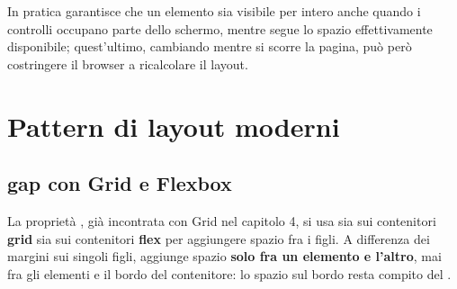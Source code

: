 In pratica  garantisce che un elemento sia visibile per intero
anche quando i controlli occupano parte dello schermo, mentre 
segue lo spazio effettivamente disponibile; quest'ultimo, cambiando mentre si
scorre la pagina, può però costringere il browser a ricalcolare il layout.

\section{Pattern di layout moderni}

\subsection{gap con Grid e Flexbox}

La proprietà , già incontrata con Grid nel capitolo 4, si usa sia sui
contenitori \textbf{grid} sia sui contenitori \textbf{flex} per aggiungere spazio
fra i figli. A differenza dei margini sui singoli figli,  aggiunge
spazio \textbf{solo fra un elemento e l'altro}, mai fra gli elementi e il bordo
del contenitore: lo spazio sul bordo resta compito del .

